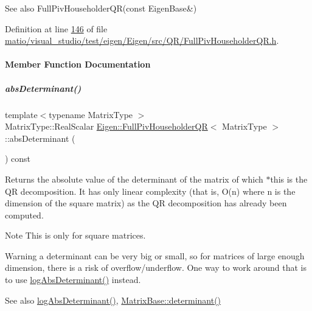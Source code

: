 \begin{DoxySeeAlso}{See also}
Full\+Piv\+Householder\+Q\+R(const Eigen\+Base\&) 
\end{DoxySeeAlso}


Definition at line \hyperlink{matio_2visual__studio_2test_2eigen_2_eigen_2src_2_q_r_2_full_piv_householder_q_r_8h_source_l00146}{146} of file \hyperlink{matio_2visual__studio_2test_2eigen_2_eigen_2src_2_q_r_2_full_piv_householder_q_r_8h_source}{matio/visual\+\_\+studio/test/eigen/\+Eigen/src/\+Q\+R/\+Full\+Piv\+Householder\+Q\+R.\+h}.



\paragraph{Member Function Documentation}
\mbox{\label{group___q_r___module_a1029e1ccc70bb8669043c5775e7f3b75}} 
\subparagraph{\texorpdfstring{abs\+Determinant()}{absDeterminant()}\hspace{0.1cm}{\footnotesize\ttfamily [1/2]}}
{\footnotesize\ttfamily template$<$typename Matrix\+Type $>$ \\
Matrix\+Type\+::\+Real\+Scalar \hyperlink{group___q_r___module_class_eigen_1_1_full_piv_householder_q_r}{Eigen\+::\+Full\+Piv\+Householder\+QR}$<$ Matrix\+Type $>$\+::abs\+Determinant (\begin{DoxyParamCaption}{ }\end{DoxyParamCaption}) const}

\begin{DoxyReturn}{Returns}
the absolute value of the determinant of the matrix of which $\ast$this is the QR decomposition. It has only linear complexity (that is, O(n) where n is the dimension of the square matrix) as the QR decomposition has already been computed.
\end{DoxyReturn}
\begin{DoxyNote}{Note}
This is only for square matrices.
\end{DoxyNote}
\begin{DoxyWarning}{Warning}
a determinant can be very big or small, so for matrices of large enough dimension, there is a risk of overflow/underflow. One way to work around that is to use \hyperlink{group___q_r___module_aafde38918912c9b562f44b0fc3b22589}{log\+Abs\+Determinant()} instead.
\end{DoxyWarning}
\begin{DoxySeeAlso}{See also}
\hyperlink{group___q_r___module_aafde38918912c9b562f44b0fc3b22589}{log\+Abs\+Determinant()}, \hyperlink{group___core___module_a7ad8f77004bb956b603bb43fd2e3c061}{Matrix\+Base\+::determinant()} 
\end{DoxySeeAlso}


